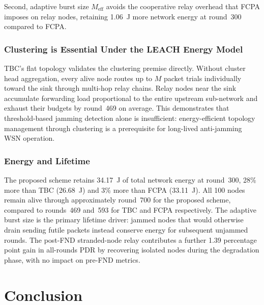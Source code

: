 \documentclass[conference]{IEEEtran}
\begin{document}
Second, adaptive burst size $M_{\text{eff}}$ avoids the cooperative relay
overhead that FCPA imposes on relay nodes, retaining 1.06~J more network
energy at round~300 compared to FCPA.

\subsubsection{Clustering is Essential Under the LEACH Energy Model}
TBC's flat topology validates the clustering premise directly. Without
cluster head aggregation, every alive node routes up to $M$ packet trials
individually toward the sink through multi-hop relay chains. Relay nodes
near the sink accumulate forwarding load proportional to the entire
upstream sub-network and exhaust their budgets by round~469 on average.
This demonstrates that threshold-based jamming detection alone is
insufficient: energy-efficient topology management through clustering
is a prerequisite for long-lived anti-jamming WSN operation.

\subsubsection{Energy and Lifetime}
The proposed scheme retains 34.17~J of total network energy at
round~300, 28\% more than TBC (26.68~J) and 3\% more than FCPA
(33.11~J). All 100 nodes remain alive through approximately round~700
for the proposed scheme, compared to rounds~469 and~593 for TBC and
FCPA respectively. The adaptive burst size is the primary lifetime
driver: jammed nodes that would otherwise drain sending futile packets
instead conserve energy for subsequent unjammed rounds. The post-FND
stranded-node relay contributes a further 1.39 percentage point gain in
all-rounds PDR by recovering isolated nodes during the degradation
phase, with no impact on pre-FND metrics.

\FloatBarrier
\section{Conclusion}
\label{sec:conclusion}
\end{document}
